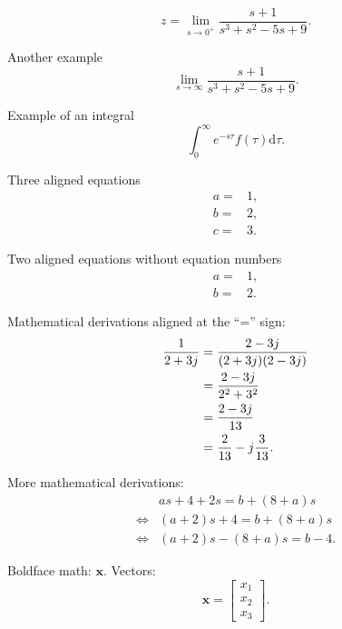 \documentclass[a4paper,11pt,reqno]{amsart}
\newcommand{\dd}{\mathrm{d}}
\begin{document}
        \begin{equation}
            z = \lim_{s\to0^+}\frac{s+1}{s^3+s^2-5s+9}.
        \end{equation}
        
        Another example
        \begin{equation}
            \lim_{s\to\infty} \frac{s+1}{s^3+s^2-5s+9}.
        \end{equation}
        
        Example of an integral
        \begin{equation}
            \int_0^\infty e^{-s\tau}f(\tau)\dd\tau.
        \end{equation}
        
        Three aligned equations
        \begin{align}
            a =& 1,
            \\
            b =& 2,
            \\
            c =& 3.
        \end{align}
        
        Two aligned equations without equation numbers
        \begin{align*}
            a =& 1,
            \\
            b =& 2.
        \end{align*}
        
        Mathematical derivations aligned at the ``='' sign:
        \begin{align}
            \frac{1}{2+3j} {}={}& \frac{2-3j}{(2+3j)(2-3j)}
            \notag\\
            {}={}& \frac{2-3j}{2^2 + 3^2}
            \notag\\
            {}={}& \frac{2-3j}{13}
            \notag\\
            {}={}&\frac{2}{13} - j\frac{3}{13}.
        \end{align}
        
        More mathematical derivations:
        \begin{align*}
            & as + 4 + 2s = b + (8+a)s
            \\
            \Leftrightarrow{}& (a+2)s + 4 = b + (8+a)s
            \\
            \Leftrightarrow{}& (a+2)s - (8+a)s = b - 4.
        \end{align*}
        
        Boldface math: $\bm{x}$. Vectors:
        \begin{equation}
            \bm{x} = 
            \begin{bmatrix}
                x_1
                \\
                x_2
                \\
                x_3
            \end{bmatrix}.
        \end{equation}
        
\end{document}
